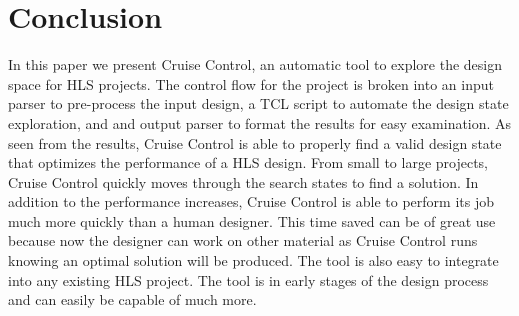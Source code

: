 \documentclass[letterpaper, 10 pt, conference]{IEEEconf}  %
\begin{document}
\section{Conclusion}
In this paper we present Cruise Control, an automatic tool to explore the design space for HLS projects. The control flow for the project is broken into an input parser to pre-process the input design, a TCL script to automate the design state exploration, and and output parser to format the results for easy examination. As seen from the results, Cruise Control is able to properly find a valid design state that optimizes the performance of a HLS design. From small to large projects, Cruise Control quickly moves through the search states to find a solution. In addition to the performance increases, Cruise Control is able to perform its job much more quickly than a human designer. This time saved can be of great use because now the designer can work on other material as Cruise Control runs knowing an optimal solution will be produced. The tool is also easy to integrate into any existing  HLS project. The tool is in early stages of the design process and can easily be capable of much more. 
\end{document}
